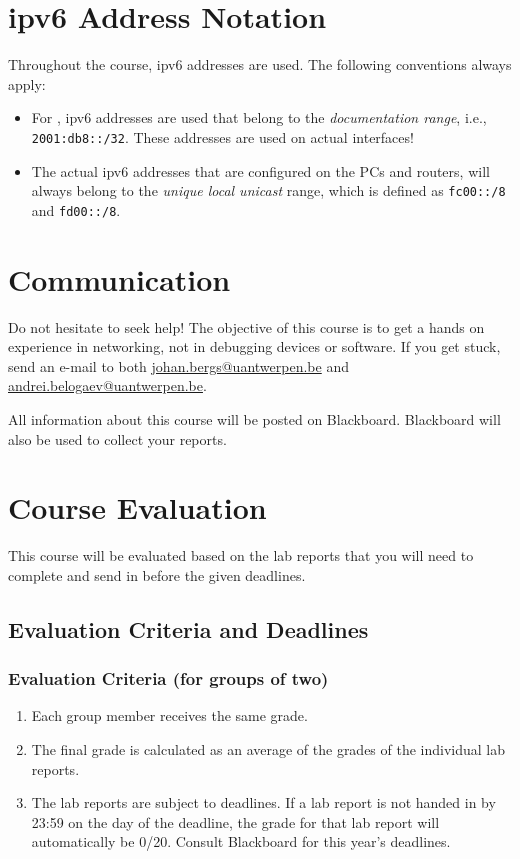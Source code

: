 \section{\acs{ipv6} Address Notation}
Throughout the course, \ac{ipv6} addresses are used. The following conventions always apply:
\begin{itemize}
\item For , \ac{ipv6} addresses are used that belong to the \emph{documentation range}, i.e., \texttt{2001:db8::/32}. These addresses are  used on actual interfaces!
\item The actual \ac{ipv6} addresses that are configured on the PCs and routers, will always belong to the \emph{unique local unicast} range, which is defined as \texttt{fc00::/8} and \texttt{fd00::/8}.
\end{itemize}


\section{Communication}

Do not hesitate to seek help! The objective of this course is to get a hands on experience in networking, not in debugging devices or software. If you get stuck, send an e-mail to both \href{mailto:johan.bergs@uantwerpen.be}{johan.bergs@uantwerpen.be} and \href{mailto:andrei.belogaev@uantwerpen.be}{andrei.belogaev@uantwerpen.be}.

All information about this course will be posted on Blackboard. Blackboard will also be used to collect your reports.

\section{Course Evaluation}

This course will be evaluated based on the lab reports that you will need to complete and send in before the given deadlines.

\subsection*{Evaluation Criteria and Deadlines}
\subsubsection{Evaluation Criteria (for groups of two)}
\begin{enumerate}
\item Each group member receives the same grade.
\item The final grade is calculated as an average of the grades of the individual lab reports.
\item The lab reports are subject to deadlines. If a lab report is not handed in by 23:59 on the day of the deadline, the grade for that lab report will automatically be 0/20. Consult Blackboard for this year's deadlines.
\end{enumerate}

